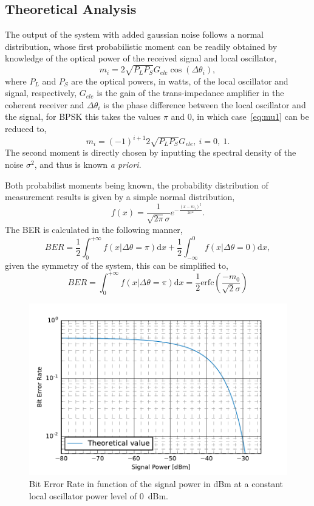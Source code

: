 \subsection{Theoretical Analysis}

The output of the system with added gaussian noise follows a normal distribution, whose first probabilistic moment can be readily obtained by knowledge of the optical power of the received signal and local oscillator,
\begin{equation}\label{eq:mu1}
m_i=2\sqrt{P_LP_S}G_{ele}\cos(\Delta\theta_i),
\end{equation}
where $P_L$ and $P_S$ are the optical powers, in watts, of the local oscillator and signal, respectively, $G_{ele}$ is the gain of the trans-impedance amplifier in the coherent receiver and $\Delta\theta_i$ is the phase difference between the local oscillator and the signal, for BPSK this takes the values $\pi$ and 0, in which case~\eqref{eq:mu1} can be reduced to,
\begin{equation}
m_i=(-1)^{i+1}2\sqrt{P_LP_S}G_{ele},~i=0,~1.
\end{equation}
The second moment is directly chosen by inputting the spectral density of the noise $\sigma^2$, and thus is known \textit{a priori}.
\par
Both probabilist moments being known, the probability distribution of measurement results is given by a simple normal distribution,
\begin{equation}
f(x)=\frac{1}{\sqrt{2\pi}\sigma}e^{-\frac{(x-m_i)^2}{2\sigma^2}}.
\end{equation}
The BER is calculated in the following manner,
\begin{equation}
BER=\frac{1}{2}\int_0^{+\infty}f(x|\Delta\theta=\pi)\text{d}x+\frac{1}{2}\int^0_{-\infty}f(x|\Delta\theta=0)\text{d}x,
\end{equation}
given the symmetry of the system, this can be simplified to,
\begin{equation}\label{eq:BERtheoretical}
BER=\int_0^{+\infty}f(x|\Delta\theta=\pi)\text{d}x=\frac{1}{2}\text{erfc}\left(\frac{-m_0}{\sqrt{2}\sigma}\right)
\end{equation}

\begin{figure}[H]
\centering
\includegraphics[width=.7\linewidth]{./sdf/bpsk_system/figures/BER_Evolution_theo.pdf}
\caption{Bit Error Rate in function of the signal power in dBm at a constant local oscillator power level of 0~dBm.}
\label{fig:berevolution}
\end{figure}

